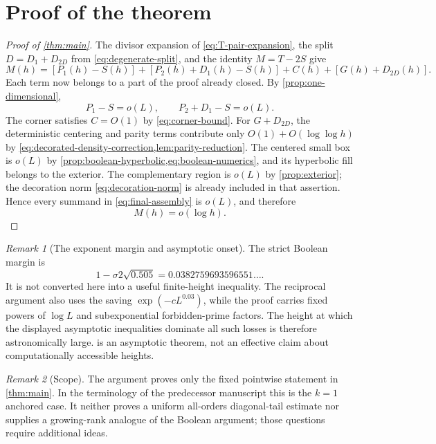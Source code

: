 \documentclass[11pt]{article}
\theoremstyle{definition}
\theoremstyle{remark}
\newtheorem{remark}[remark]{Remark}
\newcommand{\1}{\mathbf 1}
\newcommand{\llog}{\log\log}
\begin{document}
\section{Proof of the theorem}\label{sec:final-assembly}

\begin{proof}[Proof of \cref{thm:main}]
The divisor expansion of \cref{eq:T-pair-expansion}, the split $D=D_1+D_{2D}$ from \cref{eq:degenerate-split}, and the identity $M=T-2S$ give
\begin{equation}\label{eq:final-assembly}
\boxed{
M(h)=[P_1(h)-S(h)]+[P_2(h)+D_1(h)-S(h)]
     +C(h)+[G(h)+D_{2D}(h)].
}
\end{equation}
Each term now belongs to a part of the proof already closed.  By \cref{prop:one-dimensional},
\[
P_1-S=o(L),\qquad P_2+D_1-S=o(L).
\]
The corner satisfies $C=O(1)$ by \cref{eq:corner-bound}.  For $G+D_{2D}$, the deterministic centering and parity terms contribute only $O(1)+O(\llog h)$ by \cref{eq:decorated-density-correction,lem:parity-reduction}.  The centered small box is $o(L)$ by \cref{prop:boolean-hyperbolic,eq:boolean-numerics}, and its hyperbolic fill belongs to the exterior.  The complementary region is $o(L)$ by \cref{prop:exterior}; the decoration norm \cref{eq:decoration-norm} is already included in that assertion.  Hence every summand in \cref{eq:final-assembly} is $o(L)$, and therefore
\[
M(h)=o(\log h).
\]
\end{proof}

\begin{remark}[The exponent margin and asymptotic onset]\label{rem:onset}
The strict Boolean margin is
\[
1-\sigma 2\sqrt{0.505}=0.0382759693596551\ldots.
\]
It is not converted here into a useful finite-height inequality.  The reciprocal argument also uses the saving $\exp(-cL^{0.03})$, while the proof carries fixed powers of $\log L$ and subexponential forbidden-prime factors.  The height at which the displayed asymptotic inequalities dominate all such losses is therefore astronomically large.   is an asymptotic theorem, not an effective claim about computationally accessible heights.
\end{remark}

\begin{remark}[Scope]\label{rem:scope}
The argument proves only the fixed pointwise statement in \cref{thm:main}.  In the terminology of the predecessor manuscript this is the $k=1$ anchored case.  It neither proves a uniform all-orders diagonal-tail estimate nor supplies a growing-rank analogue of the Boolean argument; those questions require additional ideas.
\end{remark}
\end{document}
